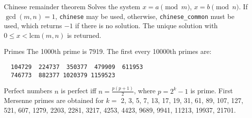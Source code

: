\clearpage
{}
\categorycontents{}



\begin{algorithm}{Chinese remainder theorem}
\desc
Solves the system $x = a \pmod m$, $x = b \pmod n$.  If $\gcd(m,n) =
1$, {\tt chinese} may be used, otherwise, {\tt chinese\_common} must be
used, which returns $-1$ if there is no solution.  The unique solution
with $0 \le x < \mathrm{lcm}(m, n)$ is returned.
\end{algorithm}

\begin{algorithm}{Primes}
\desc
The 1000th prime is 7919. The first every 10000th primes are: {\small
\begin{verbatim}
  104729  224737  350377  479909  611953
  746773  882377 1020379 1159523
\end{verbatim}
}\end{algorithm}




\begin{algorithm}{Perfect numbers}
\label{perfnum}
\desc
$n$ is perfect iff $n = \frac{p(p+1)}{2}$, where $p = 2^k-1$ is prime.
First Mersenne primes are obtained for $k =$ 2, 3, 5, 7, 13, 17, 19,
31, 61, 89, 107, 127, 521, 607, 1279, 2203, 2281, 3217, 4253, 4423,
9689, 9941, 11213, 19937, 21701.\\
\end{algorithm}

